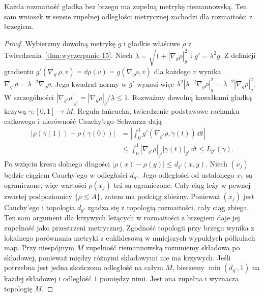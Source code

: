 \begin{stwierdzenie}
\label{prop:metryka-zupelna-wyczerpanie}
Każda rozmaitość gładka bez brzegu
ma zupełną metrykę riemannowską.
Ten sam wniosek w sensie zupełnej
odległości metrycznej zachodzi
dla rozmaitości z brzegiem.
\end{stwierdzenie}
\begin{proof}
Wybierzmy dowolną metrykę $g$
i gładkie właściwe $\rho$
z Twierdzenia~\ref{thm:wyczerpanie-15}.
Niech
$\lambda=\sqrt{1+|\nabla_g\rho|_g^2}$
i $g'=\lambda^2g$.
Z definicji gradientu
$g'(\nabla_{g'}\rho,v)=\dd\rho(v)=g(\nabla_g\rho,v)$
dla każdego $v$ wynika
$\nabla_{g'}\rho=\lambda^{-2}\nabla_g\rho$.
Jego kwadrat normy w $g'$ wynosi więc
$\lambda^2|\lambda^{-2}\nabla_g\rho|_g^2
=\lambda^{-2}|\nabla_g\rho|_g^2$. W szczególności
$|\nabla_{g'}\rho|_{g'}
=|\nabla_g\rho|_g/\lambda\leq1$.
Rozważmy dowolną kawałkami gładką krzywą
$\gamma:[0,1]\to M$. Reguła łańcucha, twierdzenie
podstawowe rachunku całkowego i nierówność
Cauchy'ego--Schwarza dają
\[
 \begin{aligned}
 |\rho(\gamma(1))-\rho(\gamma(0))|
 &=\left|\int_0^1
       g'(\nabla_{g'}\rho,\dot\gamma(t))\,\dd t\right|\\
 &\leq\int_0^1|\nabla_{g'}\rho|_{g'}|\dot\gamma(t)|_{g'}\,\dd t
 \leq L_{g'}(\gamma).
 \end{aligned}
\]
Po wzięciu kresu dolnego długości
$|\rho(x)-\rho(y)|\leq d_{g'}(x,y)$.
Niech $(x_j)$ będzie ciągiem Cauchy'ego
w odległości $d_{g'}$. Jego odległości
od ustalonego $x_1$ są ograniczone,
więc wartości $\rho(x_j)$ też są
ograniczone. Cały ciąg leży
w pewnej zwartej podpoziomicy
$\{\rho\leq A\}$, zatem ma podciąg
zbieżny. Ponieważ $(x_j)$ jest
Cauchy'ego i topologia $d_{g'}$
zgadza się z topologią rozmaitości,
cały ciąg zbiega. Ten sam argument
dla krzywych leżących w rozmaitości
z brzegiem daje jej zupełność
jako przestrzeni metrycznej. Zgodność topologii
przy brzegu wynika z lokalnego porównania metryki
z euklidesową w mniejszych wypukłych półkulach map.
Przy niespójnym $M$ zupełność riemannowską rozumiemy
składowa po składowej, ponieważ między różnymi składowymi
nie ma krzywych. Jeśli potrzebna jest jedna skończona
odległość na całym $M$, bierzemy $\min(d_{g'},1)$
na każdej składowej i odległość $1$ pomiędzy nimi.
Jest ona zupełna i wyznacza topologię $M$.
\end{proof}

